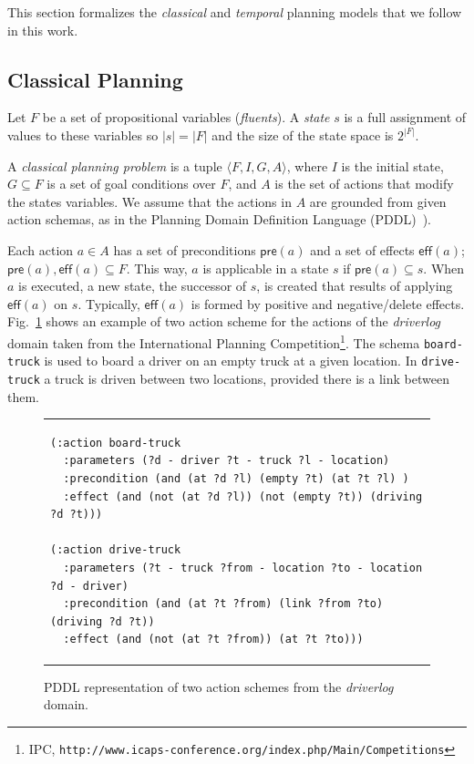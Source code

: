 \documentclass[runningheads]{llncs}
\newcommand{\tup}[1]{{\langle #1 \rangle}}
\newcommand{\pre}{\mathsf{pre}}    %
\newcommand{\eff}{\mathsf{eff}}    %
\begin{document}
This section formalizes the {\em classical} and {\em temporal} planning models that we follow in this work.

\subsection{Classical Planning}
\label{sec:classicalplanning}
Let $F$ be a set of propositional variables ({\em fluents}). A {\em state} $s$ is a full assignment of values to these variables so $|s|=|F|$ and the size of the state space is $2^{|F|}$.

A {\em classical planning problem} is a tuple $\tup{F,I,G,A}$, where $I$ is the initial state, $G \subseteq F$ is a set of goal conditions over $F$, and $A$ is the set of actions that modify the states variables. We assume that the actions in $A$ are grounded from given action schemas, as in the Planning Domain Definition Language (PDDL)~\cite{fox2003pddl2,Ghallab98,ghallab2004automated}).

Each action $a \in A$ has a set of preconditions $\pre(a)$ and a set of effects $\eff(a)$; $\pre(a), \eff(a) \subseteq F$. This way, $a$ is applicable in a state $s$ if $\pre(a) \subseteq s$. When $a$ is executed, a new state, the successor of $s$, is created that results of applying $\eff(a)$ on $s$. Typically, $\eff(a)$ is formed by positive and negative/delete effects. Fig.~\ref{fig:exampleactions1} shows an example of two action scheme for the actions of the \emph{driverlog} domain taken from the International Planning Competition\footnote{IPC, \texttt{http://www.icaps-conference.org/index.php/Main/Competitions}}. The schema \texttt{board-truck} is used to board a driver on an empty truck at a given location. In \texttt{drive-truck} a truck is driven between two locations, provided there is a link between them.

\begin{figure}
\begin{tabular}{p{\textwidth}}
\begin{verbatim}
(:action board-truck
  :parameters (?d - driver ?t - truck ?l - location)
  :precondition (and (at ?d ?l) (empty ?t) (at ?t ?l) )
  :effect (and (not (at ?d ?l)) (not (empty ?t)) (driving ?d ?t)))

(:action drive-truck
  :parameters (?t - truck ?from - location ?to - location ?d - driver)
  :precondition (and (at ?t ?from) (link ?from ?to) (driving ?d ?t))
  :effect (and (not (at ?t ?from)) (at ?t ?to)))
\end{verbatim}
\end{tabular}
\caption{\small PDDL representation of two action schemes from the {\em driverlog} domain.}
\label{fig:exampleactions1}
\end{figure}
\end{document}
